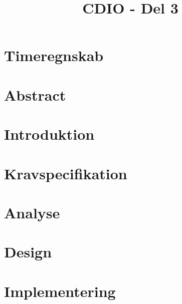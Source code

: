 \documentclass[12pt,oneside,a4paper,english]{article}
\title{CDIO - Del 3} %
\begin{document}


\newpage
\doublespacing
\renewcommand{\baselinestretch}{1}\normalsize
\tableofcontents
\renewcommand{\baselinestretch}{1}\normalsize
\thispagestyle{fancy} %

\newpage
\section{Timeregnskab}

\thispagestyle{fancy}

\newpage
\section{Abstract}

\thispagestyle{fancy}

\newpage
\section{Introduktion}

\thispagestyle{fancy}

\newpage
\section{Kravspecifikation}

\thispagestyle{fancy}

\newpage
\section{Analyse}

\thispagestyle{fancy}





\newpage
\section{Design}

\thispagestyle{fancy}



\newpage
\section{Implementering}

\thispagestyle{fancy}
\end{document}
